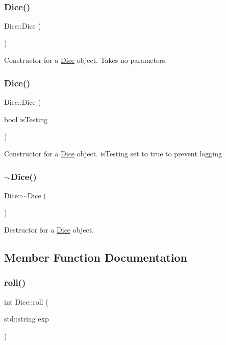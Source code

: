 \subsubsection{\texorpdfstring{Dice()}{Dice()}\hspace{0.1cm}{\footnotesize\ttfamily [1/2]}}
{\footnotesize\ttfamily Dice\+::\+Dice (\begin{DoxyParamCaption}{ }\end{DoxyParamCaption})}

Constructor for a \hyperlink{class_dice}{Dice} object. Takes no parameters. \hypertarget{class_dice_ad72fb3216967ca28dc6f81653f4c3c07}{}\label{class_dice_ad72fb3216967ca28dc6f81653f4c3c07} 
\subsubsection{\texorpdfstring{Dice()}{Dice()}\hspace{0.1cm}{\footnotesize\ttfamily [2/2]}}
{\footnotesize\ttfamily Dice\+::\+Dice (\begin{DoxyParamCaption}\item[{bool}]{is\+Testing }\end{DoxyParamCaption})}

Constructor for a \hyperlink{class_dice}{Dice} object. is\+Testing set to true to prevent logging \hypertarget{class_dice_a48e90392d2ff1e6736c88f22e8a87751}{}\label{class_dice_a48e90392d2ff1e6736c88f22e8a87751} 
\subsubsection{\texorpdfstring{$\sim$\+Dice()}{~Dice()}}
{\footnotesize\ttfamily Dice\+::$\sim$\+Dice (\begin{DoxyParamCaption}{ }\end{DoxyParamCaption})}

Destructor for a \hyperlink{class_dice}{Dice} object. 

\subsection{Member Function Documentation}
\hypertarget{class_dice_a0bc8f4b697804af0785f34b801cd6feb}{}\label{class_dice_a0bc8f4b697804af0785f34b801cd6feb} 
\subsubsection{\texorpdfstring{roll()}{roll()}}
{\footnotesize\ttfamily int Dice\+::roll (\begin{DoxyParamCaption}\item[{std\+::string}]{exp }\end{DoxyParamCaption})}

